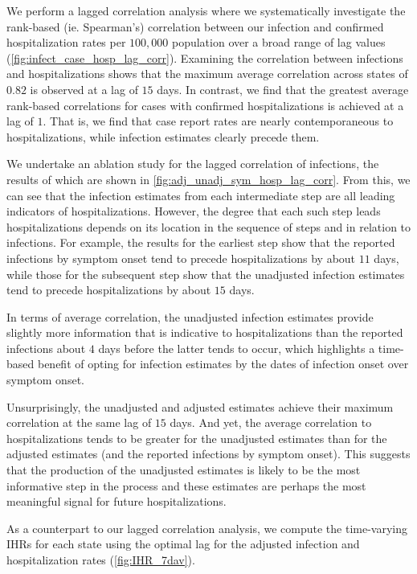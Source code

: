 \documentclass{article}
\begin{document}
We perform a lagged correlation analysis where we systematically investigate the
rank-based (ie. Spearman's) correlation between our infection and confirmed
hospitalization rates per $100,000$ population over a broad range of lag values
(\autoref{fig:infect_case_hosp_lag_corr}). Examining the correlation between infections and
hospitalizations shows that the maximum average correlation across states of $0.82$ is 
observed at a lag of $15$ days. In contrast, we find that the greatest average
rank-based correlations for cases with confirmed hospitalizations is achieved at a lag of
$1$. That is, we find that case report rates are nearly contemporaneous to
hospitalizations, while infection estimates clearly precede them. 

We undertake an ablation study for the lagged correlation of infections, the results of which 
are  shown in \autoref{fig:adj_unadj_sym_hosp_lag_corr}. From this, we can see that the 
infection estimates from each intermediate 
step are all leading indicators of hospitalizations. However, the degree that each such step 
leads hospitalizations depends on its location in the sequence of steps and in relation to 
infections. For example, the results for the earliest step show that the 
reported infections by symptom onset tend to precede hospitalizations by about $11$
days, while those for the subsequent step show that the unadjusted infection estimates
tend to precede hospitalizations by about $15$ days.

In terms of average correlation, the unadjusted infection estimates provide slightly more
information that is indicative to hospitalizations than the reported infections about $4$ 
days before the latter tends to occur, which highlights a time-based benefit of opting for
infection estimates by the dates of infection onset over symptom onset. 

Unsurprisingly, the unadjusted and adjusted estimates achieve their maximum correlation
at the same lag of $15$ days. And yet, the average correlation to hospitalizations
tends to be greater for the unadjusted estimates than for the adjusted estimates (and
the reported infections by symptom onset). This suggests that the production of the
unadjusted estimates is likely to be the most informative step in the process and
these estimates are perhaps the most meaningful signal for future hospitalizations.

As a counterpart to our lagged correlation analysis, we compute the time-varying IHRs 
for each state using the optimal lag for the adjusted infection and hospitalization rates 
(\autoref{fig:IHR_7dav}). 
\end{document}
